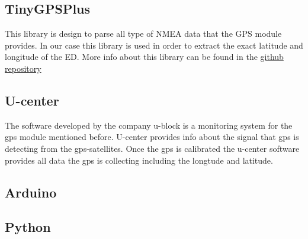 \subsection{TinyGPSPlus}
\label{sec:s-m-tinygps}
This library is design to parse all type of NMEA data that the GPS module provides. In our case this 
library is used in order to extract the exact latitude and longitude of the ED. More info about this 
library can be found in the \href{https://github.com/mikalhart/TinyGPSPlus}{github repository}

\subsection{U-center}
\label{sec:s-m-ucenter}
The software developed by the company u-block is a monitoring system for the gps module mentioned before. 
U-center provides info about the signal that gps is detecting from the gps-satellites. Once the gps is 
calibrated the u-center software provides all data the gps is collecting including the longtude and latitude.

\subsection{Arduino}
\label{sec:s-m-lmic}

\subsection{Python}
\